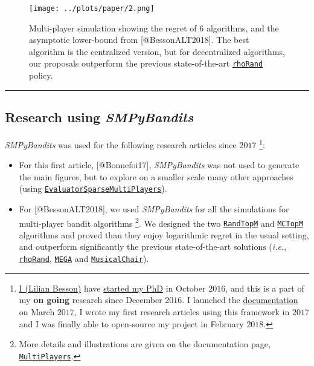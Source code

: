 \begin{figure}
\centering
\texttt{[image: ../plots/paper/2.png]}
\caption{Multi-player simulation showing the regret of \(6\) algorithms,
and the asymptotic lower-bound from {[}@BessonALT2018{]}. The best
algorithm is the centralized version, but for decentralized algorithms,
our proposals outperform the previous state-of-the-art
\href{https://smpybandits.github.io/docs/PoliciesMultiPlayers.rhoRand.html}{\texttt{rhoRand}}
policy.\label{fig:plot2}}
\end{figure}

\begin{center}\rule{0.5\linewidth}{\linethickness}\end{center}

\hypertarget{research-using-smpybandits}{%
\subsection{\texorpdfstring{Research using
\emph{SMPyBandits}}{Research using SMPyBandits}}\label{research-using-smpybandits}}

\emph{SMPyBandits} was used for the following research articles since
\(2017\) \footnote{\href{http://perso.crans.org/besson/}{I (Lilian
  Besson)} have \href{http://perso.crans.org/besson/phd/}{started my
  PhD} in October \(2016\), and this is a part of my \textbf{on going}
  research since December \(2016\). I launched the
  \href{https://smpybandits.github.io/}{documentation} on March
  \(2017\), I wrote my first research articles using this framework in
  \(2017\) and I was finally able to open-source my project in February
  \(2018\).}:

\begin{itemize}
\item
  For this first article, {[}@Bonnefoi17{]}, \emph{SMPyBandits} was not
  used to generate the main figures, but to explore on a smaller scale
  many other approaches (using
  \href{https://smpybandits.github.io/docs/Environment.EvaluatorSparseMultiPlayers.html}{\texttt{EvaluatorSparseMultiPlayers}}).
\item
  For {[}@BessonALT2018{]}, we used \emph{SMPyBandits} for all the
  simulations for multi-player bandit algorithms \footnote{More details
    and illustrations are given on the documentation page,
    \href{https://smpybandits.github.io/MultiPlayers.html}{\texttt{MultiPlayers}}.}.
  We designed the two
  \href{https://smpybandits.github.io/docs/PoliciesMultiPlayers.RandTopM.html}{\texttt{RandTopM}}
  and
  \href{https://smpybandits.github.io/docs/PoliciesMultiPlayers.MCTopM.html}{\texttt{MCTopM}}
  algorithms and proved than they enjoy logarithmic regret in the usual
  setting, and outperform significantly the previous state-of-the-art
  solutions (\emph{i.e.},
  \href{https://smpybandits.github.io/docs/PoliciesMultiPlayers.rhoRand.html}{\texttt{rhoRand}},
  \href{https://smpybandits.github.io/docs/Policies.MEGA.html}{\texttt{MEGA}}
  and
  \href{https://smpybandits.github.io/docs/Policies.MusicalChair.html}{\texttt{MusicalChair}}).
\end{itemize}


